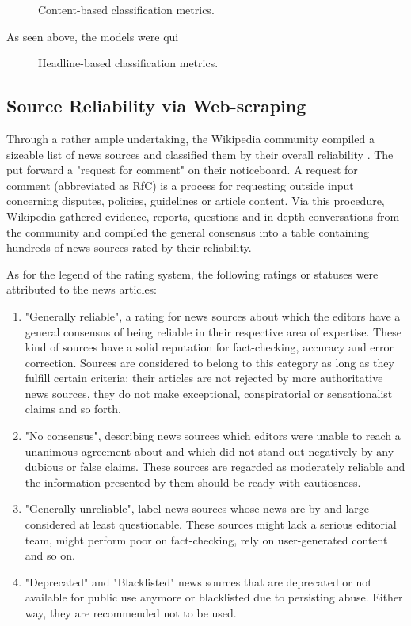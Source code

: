 \begin{figure}[h]
  \centering
  \caption{Content-based classification metrics.}
\end{figure}

As seen above, the models were qui

\begin{figure}[h]
  \centering
  \caption{Headline-based classification metrics.}
\end{figure}

\subsection{Source Reliability via Web-scraping}
Through a rather ample undertaking, the Wikipedia community compiled a sizeable list of news sources and classified them by their overall reliability \cite{wiki_reliable_sources}. The put forward a "request for comment" on their noticeboard. A request for comment (abbreviated as RfC) is a process for requesting outside input concerning disputes, policies, guidelines or article content. Via this procedure, Wikipedia gathered evidence, reports, questions and in-depth conversations from the community and compiled the general consensus into a table containing hundreds of news sources rated by their reliability.

As for the legend of the rating system, the following ratings or statuses were attributed to the news articles:
\begin{enumerate}
  \item "Generally reliable", a rating for news sources about which the editors have a general consensus of being reliable in their respective area of expertise. These kind of sources have a solid reputation for fact-checking, accuracy and error correction. Sources are considered to belong to this category as long as they fulfill certain criteria: their articles are not rejected by more authoritative news sources, they do not make exceptional, conspiratorial or sensationalist claims and so forth.
  \item "No consensus", describing news sources which editors were unable to reach a unanimous agreement about and which did not stand out negatively by any dubious or false claims. These sources are regarded as moderately reliable and the information presented by them should be ready with cautiosness.
  \item "Generally unreliable", label news sources whose news are by and large considered at least questionable. These sources might lack a serious editorial team, might perform poor on fact-checking, rely on user-generated content and so on. 
  \item "Deprecated" and "Blacklisted" news sources that are deprecated or not available for public use anymore or blacklisted due to persisting abuse. Either way, they are recommended not to be used.
\end{enumerate}

